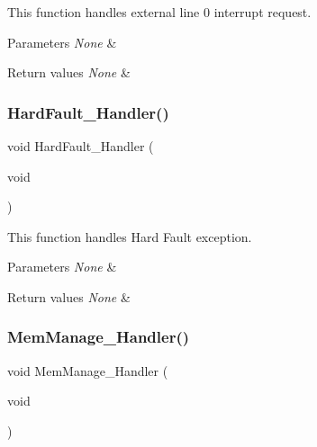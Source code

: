 This function handles external line 0 interrupt request. 


\begin{DoxyParams}{Parameters}
{\em None} & \\
\hline
\end{DoxyParams}

\begin{DoxyRetVals}{Return values}
{\em None} & \\
\hline
\end{DoxyRetVals}
\mbox{\label{group__UART__TwoBoards__ComIT_ga4a5138c64667901a5a25fb365f287b6d}} 
\subsubsection{\texorpdfstring{Hard\+Fault\+\_\+\+Handler()}{HardFault\_Handler()}}
{\footnotesize\ttfamily void Hard\+Fault\+\_\+\+Handler (\begin{DoxyParamCaption}\item[{void}]{ }\end{DoxyParamCaption})}



This function handles Hard Fault exception. 


\begin{DoxyParams}{Parameters}
{\em None} & \\
\hline
\end{DoxyParams}

\begin{DoxyRetVals}{Return values}
{\em None} & \\
\hline
\end{DoxyRetVals}
\mbox{\label{group__UART__TwoBoards__ComIT_ga0721f39c09b00b7bee9d7c3cfa41ec49}} 
\subsubsection{\texorpdfstring{Mem\+Manage\+\_\+\+Handler()}{MemManage\_Handler()}}
{\footnotesize\ttfamily void Mem\+Manage\+\_\+\+Handler (\begin{DoxyParamCaption}\item[{void}]{ }\end{DoxyParamCaption})}



